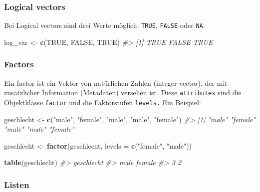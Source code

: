 \documentclass[
]{article}
\newenvironment{Shaded}{\begin{snugshade}}{\end{snugshade}}
\newcommand{\AttributeTok}[1]{\textcolor[rgb]{0.13,0.29,0.53}{#1}}
\newcommand{\CommentTok}[1]{\textcolor[rgb]{0.56,0.35,0.01}{\textit{#1}}}
\newcommand{\ConstantTok}[1]{\textcolor[rgb]{0.56,0.35,0.01}{#1}}
\newcommand{\FunctionTok}[1]{\textcolor[rgb]{0.13,0.29,0.53}{\textbf{#1}}}
\newcommand{\NormalTok}[1]{#1}
\newcommand{\OtherTok}[1]{\textcolor[rgb]{0.56,0.35,0.01}{#1}}
\newcommand{\StringTok}[1]{\textcolor[rgb]{0.31,0.60,0.02}{#1}}
\begin{document}
\hypertarget{logical-vectors}{%
\subsubsection{Logical vectors}\label{logical-vectors}}

Bei Logical vectors sind drei Werte möglich: \texttt{TRUE},
\texttt{FALSE} oder \texttt{NA}.

\begin{Shaded}
\begin{Highlighting}[]
\NormalTok{log\_var }\OtherTok{\textless{}{-}} \FunctionTok{c}\NormalTok{(}\ConstantTok{TRUE}\NormalTok{, }\ConstantTok{FALSE}\NormalTok{, }\ConstantTok{TRUE}\NormalTok{)}
\CommentTok{\#\textgreater{} [1]  TRUE FALSE  TRUE}
\end{Highlighting}
\end{Shaded}

\hypertarget{factors}{%
\subsubsection{Factors}\label{factors}}

Ein factor ist ein Vektor von natürlichen Zahlen (integer vector), der
mit zusätzlicher Information (Metadaten) versehen ist. Diese
\texttt{attributes} sind die Objektklasse \texttt{factor} und die
Faktorstufen \texttt{levels.} Ein Beispiel:

\begin{Shaded}
\begin{Highlighting}[]
\NormalTok{geschlecht }\OtherTok{\textless{}{-}} \FunctionTok{c}\NormalTok{(}\StringTok{"male"}\NormalTok{, }\StringTok{"female"}\NormalTok{, }\StringTok{"male"}\NormalTok{, }\StringTok{"male"}\NormalTok{, }\StringTok{"female"}\NormalTok{)}
\CommentTok{\#\textgreater{} [1] "male"   "female" "male"   "male"   "female"}

\NormalTok{geschlecht }\OtherTok{\textless{}{-}} \FunctionTok{factor}\NormalTok{(geschlecht, }\AttributeTok{levels =} \FunctionTok{c}\NormalTok{(}\StringTok{"female"}\NormalTok{, }\StringTok{"male"}\NormalTok{))}

\FunctionTok{table}\NormalTok{(geschlecht)}
\CommentTok{\#\textgreater{} geschlecht}
\CommentTok{\#\textgreater{}   male female }
\CommentTok{\#\textgreater{}      3      2}
\end{Highlighting}
\end{Shaded}

\hypertarget{listen}{%
\subsubsection{Listen}\label{listen}}
\end{document}
